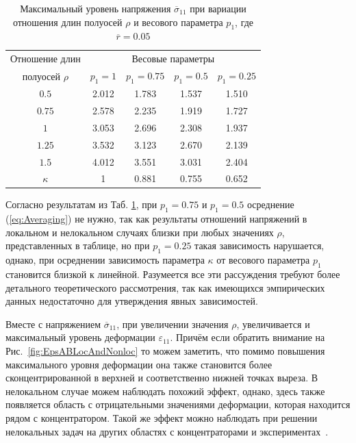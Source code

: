 \begin{table}[htbp]
    \centering
    \begin{threeparttable}%
        \caption{Максимальный уровень напряжения $\overline{\sigma}_{11}$ при вариации отношения длин полуосей $\rho$ и весового параметра $p_1$, где $\overline{r} = 0.05$}\label{tab:MaxStress}%
        \begin{tabular}{|c|c|c|c|c|}
	        \hline
			Отношение длин    & \multicolumn{4}{c|}{Весовые параметры} \\
			\cline{2-5}
			полуосей $\rho$   & $p_1 = 1$ & $p_1 = 0.75$ & $p_1 = 0.5$ & $p_1 = 0.25$ \\
			\hline
			$0.5$             & 2.012     & 1.783        & 1.537       & 1.510 \\
			\hline
			$0.75$            & 2.578     & 2.235        & 1.919       & 1.727 \\
			\hline
			$1$               & 3.053     & 2.696        & 2.308       & 1.937 \\
			\hline
			$1.25$            & 3.532     & 3.123        & 2.670       & 2.139 \\
			\hline
			$1.5$             & 4.012     & 3.551        & 3.031       & 2.404 \\
			\hline
			$\kappa$          & 1         & 0.881        & 0.755       & 0.652 \\
			\hline
        \end{tabular}
    \end{threeparttable}
\end{table}

Согласно результатам из Таб. \ref{tab:MaxStress}, при $p_1 = 0.75$ и $p_1 = 0.5$ осреднение (\ref{eq:Averaging}) не нужно, так как результаты отношений напряжений в локальном и нелокальном случаях близки при любых значениях $\rho$, представленных в таблице, но при $p_1 = 0.25$ такая зависимость нарушается, однако, при осреднении зависимость параметра $\kappa$ от весового параметра $p_1$ становится близкой к линейной. Разумеется все эти рассуждения требуют более детального теоретического рассмотрения, так как имеющихся эмпирических данных недостаточно для утверждения явных зависимостей.

Вместе с напряжением $\overline{\sigma}_{11}$, при увеличении значения $\rho$, увеличивается и максимальный уровень деформации $\varepsilon_{11}$. Причём если обратить внимание на Рис.~\ref{fig:EpsABLocAndNonloc} то можем заметить, что помимо повышения максимального уровня деформации она также становится более сконцентрированной в верхней и соответственно нижней точках выреза. В нелокальном случае можем наблюдать похожий эффект, однако, здесь также появляется область с отрицательными значениями деформации, которая находится рядом с концентратором. Такой же эффект можно наблюдать при решении нелокальных задач на других областях с концентраторами \cite{ZAMM} и \mbox{экспериментах \cite{Andreev}.}

